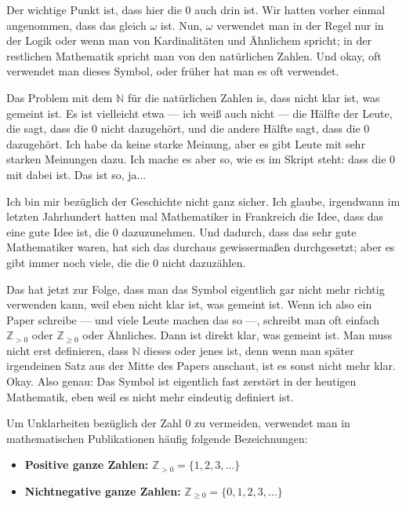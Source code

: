 \begin{spoken-clean}[00:01:49 - 00:03:53]
Der wichtige Punkt ist, dass hier die $0$ auch drin ist. Wir hatten vorher einmal angenommen, dass das gleich $\omega$ ist. Nun, $\omega$ verwendet man in der Regel nur in der Logik oder wenn man von Kardinalitäten und Ähnlichem spricht; in der restlichen Mathematik spricht man von den natürlichen Zahlen. Und okay, oft verwendet man dieses Symbol, oder früher hat man es oft verwendet.

Das Problem mit dem $\mathbb{N}$ für die natürlichen Zahlen is, dass nicht klar ist, was gemeint ist. Es ist vielleicht etwa --- ich weiß auch nicht --- die Hälfte der Leute, die sagt, dass die $0$ nicht dazugehört, und die andere Hälfte sagt, dass die $0$ dazugehört. Ich habe da keine starke Meinung, aber es gibt Leute mit sehr starken Meinungen dazu.  Ich mache es aber so, wie es im Skript steht: dass die $0$ mit dabei ist. Das ist so, ja...

Ich bin mir bezüglich der Geschichte nicht ganz sicher. Ich glaube, irgendwann im letzten Jahrhundert hatten mal Mathematiker in Frankreich die Idee, dass das eine gute Idee ist, die $0$ dazuzunehmen. Und dadurch, dass das sehr gute Mathematiker waren, hat sich das durchaus gewissermaßen durchgesetzt; aber es gibt immer noch viele, die die $0$ nicht dazuzählen.

Das hat jetzt zur Folge, dass man das Symbol eigentlich gar nicht mehr richtig verwenden kann, weil eben nicht klar ist, was gemeint ist. Wenn ich also ein Paper schreibe --- und viele Leute machen das so ---, schreibt man oft einfach $\mathbb{Z}_{>0}$ oder $\mathbb{Z}_{\ge 0}$ oder Ähnliches. Dann ist direkt klar, was gemeint ist. Man muss nicht erst definieren, dass $\mathbb{N}$ dieses oder jenes ist, denn wenn man später irgendeinen Satz aus der Mitte des Papers anschaut, ist es sonst nicht mehr klar. Okay. Also genau: Das Symbol ist eigentlich fast zerstört in der heutigen Mathematik, eben weil es nicht mehr eindeutig definiert ist.
\end{spoken-clean}

\begin{math-stroke}
Um Unklarheiten bezüglich der Zahl $0$ zu vermeiden, verwendet man in mathematischen Publikationen häufig folgende Bezeichnungen:
\begin{itemize}
    \item \textbf{Positive ganze Zahlen:} $\mathbb{Z}_{>0} = \{1, 2, 3, \dots\}$
    \item \textbf{Nichtnegative ganze Zahlen:} $\mathbb{Z}_{\ge 0} = \{0, 1, 2, 3, \dots\}$
\end{itemize}
\end{math-stroke}

